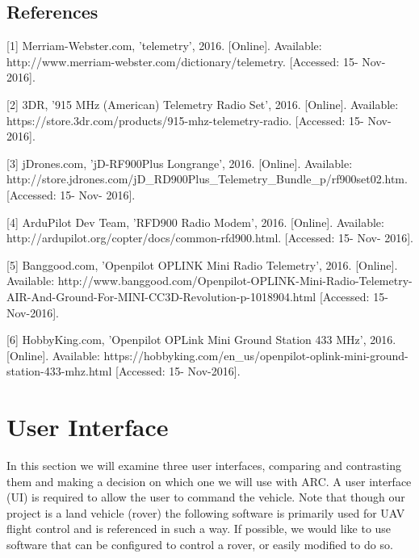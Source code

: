 \documentclass[compsoc,draftclsnofoot,onecolumn,10pt]{IEEEtran}
\begin{document}
\subsection{References}

[1] Merriam-Webster.com, 'telemetry', 2016. [Online]. Available: http://www.merriam-webster.com/dictionary/telemetry. [Accessed: 15- Nov- 2016].\par

[2] 3DR, '915 MHz (American) Telemetry Radio Set', 2016. [Online]. Available: https://store.3dr.com/products/915-mhz-telemetry-radio. [Accessed: 15- Nov- 2016].\par

[3] jDrones.com, 'jD-RF900Plus Longrange', 2016. [Online]. Available: http://store.jdrones.com/jD\_RD900Plus\_Telemetry\_Bundle\_p/rf900set02.htm. [Accessed: 15- Nov- 2016].\par

[4] ArduPilot Dev Team, 'RFD900 Radio Modem', 2016. [Online]. Available: http://ardupilot.org/copter/docs/common-rfd900.html. [Accessed: 15- Nov- 2016].\par

[5] Banggood.com, 'Openpilot OPLINK Mini Radio Telemetry', 2016. [Online].
Available: http://www.banggood.com/Openpilot-OPLINK-Mini-Radio-Telemetry-AIR-And-Ground-For-MINI-CC3D-Revolution-p-1018904.html [Accessed: 15- Nov-2016].\par

[6] HobbyKing.com, 'Openpilot OPLink Mini Ground Station 433 MHz', 2016.  [Online]. Available: https://hobbyking.com/en\_us/openpilot-oplink-mini-ground-station-433-mhz.html [Accessed: 15- Nov-2016].\par

\newpage

\section{User Interface}
In this section we will examine three user interfaces, comparing and contrasting
them and making a decision on which one we will use with ARC. 
A user interface (UI) is required to allow the user to command the vehicle. 
Note that though our project is a land vehicle (rover) the following
software is primarily used for UAV flight control and is referenced in such a
way. If possible, we would like to use software that can be configured to
control a rover, or easily modified to do so.
\end{document}
